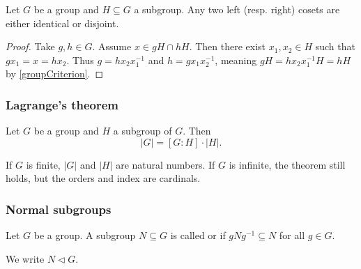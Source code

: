 \begin{lemma} \label{differentCosetsDisjoint}
Let $G$ be a group and $H\subseteq G$ a subgroup. Any two left (resp. right) cosets are either identical or disjoint.
\end{lemma}
\begin{proof}
Take $g,h\in G$. Assume $x\in gH\cap hH$. Then there exist $x_1,x_2\in H$ such that $gx_1 = x = hx_2$. Thus $g = hx_2x_1^{-1}$ and $h = gx_1x_2^{-1}$, meaning $gH = hx_2x_1^{-1}H = hH$ by \ref{groupCriterion}.
\end{proof}

\subsubsection{Lagrange's theorem}
\begin{theorem}
Let $G$ be a group and $H$ a subgroup of $G$. Then
\[ |G| = [G:H]\cdot |H|. \]
\end{theorem}
If $G$ is finite, $|G|$ and $|H|$ are natural numbers. If $G$ is infinite, the theorem still holds, but the orders and index are cardinals.

\subsubsection{Normal subgroups}
\begin{definition}
Let $G$ be a group. A subgroup $N\subseteq G$ is called  or  if $gNg^{-1} \subseteq N$ for all $g\in G$.

We write $N \lhd G$.
\end{definition}

